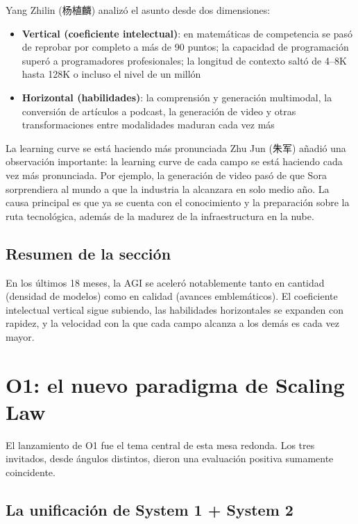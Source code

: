 \documentclass[a4paper]{article}
\begin{document}
Yang Zhilin (杨植麟) analizó el asunto desde dos dimensiones:

\begin{itemize}
\item \textbf{Vertical (coeficiente intelectual)}: en matemáticas de competencia se pasó de reprobar por completo a más de 90 puntos; la capacidad de programación superó a programadores profesionales; la longitud de contexto saltó de 4--8K hasta 128K o incluso el nivel de un millón
\item \textbf{Horizontal (habilidades)}: la comprensión y generación multimodal, la conversión de artículos a podcast, la generación de video y otras transformaciones entre modalidades maduran cada vez más
\end{itemize}

\begin{knowledgebox}{La learning curve se está haciendo más pronunciada}
Zhu Jun (朱军) añadió una observación importante: la learning curve de cada campo se está haciendo cada vez más pronunciada. Por ejemplo, la generación de video pasó de que Sora sorprendiera al mundo a que la industria la alcanzara en solo medio año. La causa principal es que ya se cuenta con el conocimiento y la preparación sobre la ruta tecnológica, además de la madurez de la infraestructura en la nube.
\end{knowledgebox}

\subsection{Resumen de la sección}

En los últimos 18 meses, la AGI se aceleró notablemente tanto en cantidad (densidad de modelos) como en calidad (avances emblemáticos). El coeficiente intelectual vertical sigue subiendo, las habilidades horizontales se expanden con rapidez, y la velocidad con la que cada campo alcanza a los demás es cada vez mayor.
\section{O1: el nuevo paradigma de Scaling Law}

El lanzamiento de O1 fue el tema central de esta mesa redonda. Los tres invitados, desde ángulos distintos, dieron una evaluación positiva sumamente coincidente.

\subsection{La unificación de System 1 + System 2}
\end{document}
